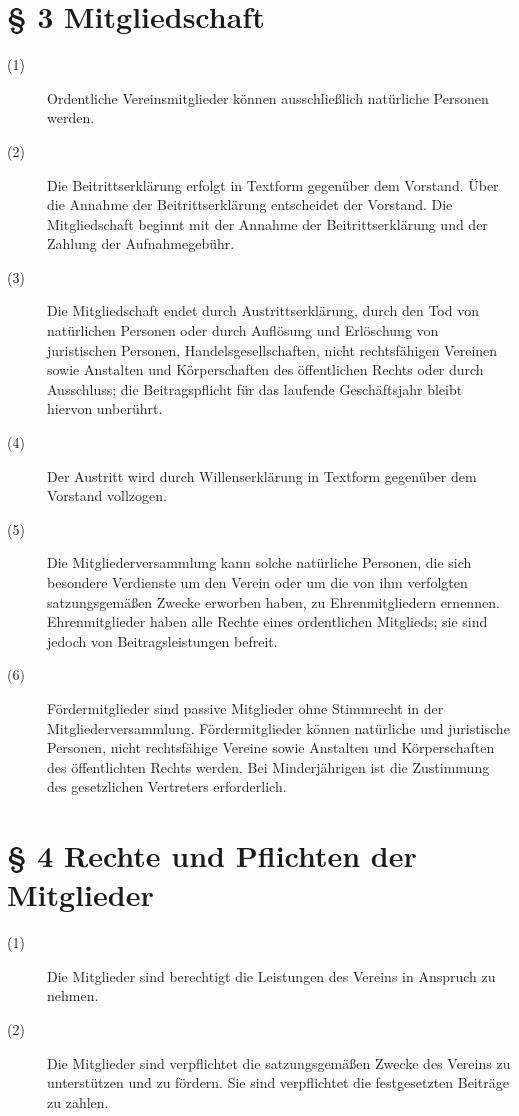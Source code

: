 \documentclass[12pt,paper=a4,ngerman]{scrreprt}
\begin{document}
\section{\S{} 3 Mitgliedschaft}
\begin{description}
	\item[(1)] Ordentliche Vereinsmitglieder können ausschließlich natürliche Personen werden.
	\item[(2)] Die Beitrittserklärung erfolgt in Textform gegenüber dem Vorstand. Über die Annahme der Beitrittserklärung entscheidet der Vorstand. Die Mitgliedschaft beginnt mit der Annahme der Beitrittserklärung und der Zahlung der Aufnahmegebühr.
	\item[(3)] Die Mitgliedschaft endet durch Austrittserklärung, durch den Tod von natürlichen Personen oder durch Auflösung und Erlöschung von juristischen Personen, Handelsgesellschaften, nicht rechtsfähigen Vereinen sowie Anstalten und Körperschaften des öffentlichen Rechts oder durch Ausschluss; die Beitragspflicht für das laufende Geschäftsjahr bleibt hiervon unberührt.
	\item[(4)] Der Austritt wird durch Willenserklärung in Textform gegenüber dem Vorstand vollzogen.
	\item[(5)] Die Mitgliederversammlung kann solche natürliche Personen, die sich besondere Verdienste um den Verein oder um die von ihm verfolgten satzungsgemäßen Zwecke erworben haben, zu Ehrenmitgliedern ernennen. Ehrenmitglieder haben alle Rechte eines ordentlichen Mitglieds; sie sind jedoch von Beitragsleistungen befreit.
	\item[(6)] Fördermitglieder sind passive Mitglieder ohne Stimmrecht in der Mitgliederversammlung. Fördermitglieder können natürliche und juristische Personen, nicht rechtsfähige Vereine sowie Anstalten und Körperschaften des öffentlichten Rechts werden. Bei Minderjährigen ist die Zustimmung des gesetzlichen Vertreters erforderlich.
\end{description}
\section{\S{} 4 Rechte und Pflichten der Mitglieder}
\begin{description}
	\item[(1)] Die Mitglieder sind berechtigt die Leistungen des Vereins in Anspruch zu nehmen.
	\item[(2)] Die Mitglieder sind verpflichtet die satzungsgemäßen Zwecke des Vereins zu unterstützen und zu fördern. Sie sind verpflichtet die festgesetzten Beiträge zu zahlen.
\end{description}
\end{document}
